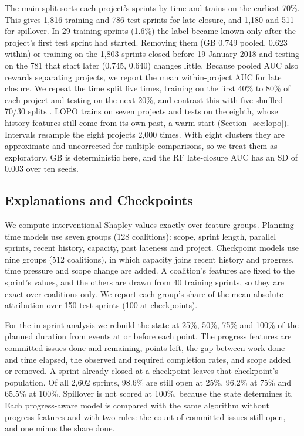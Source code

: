 \documentclass[conference]{IEEEtran}
\begin{document}
The main split sorts each project's sprints by time and trains on the earliest 70\%. This gives 1,816 training and 786 test sprints for late closure, and 1,180 and 511 for spillover. In 29 training sprints (1.6\%) the label became known only after the project's first test sprint had started. Removing them (GB 0.749 pooled, 0.623 within) or training on the 1,803 sprints closed before 19 January 2018 and testing on the 781 that start later (0.745, 0.640) changes little. Because pooled AUC also rewards separating projects, we report the mean within-project AUC for late closure. We repeat the time split five times, training on the first 40\% to 80\% of each project and testing on the next 20\%, and contrast this with five shuffled 70/30 splits \cite{r22, r24}. LOPO trains on seven projects and tests on the eighth, whose history features still come from its own past, a warm start (Section~\ref{sec:lopo}). Intervals resample the eight projects 2,000 times. With eight clusters they are approximate and uncorrected for multiple comparisons, so we treat them as exploratory. GB is deterministic here, and the RF late-closure AUC has an SD of 0.003 over ten seeds.

\subsection{Explanations and Checkpoints}

We compute interventional Shapley values exactly over feature groups. Planning-time models use seven groups (128 coalitions): scope, sprint length, parallel sprints, recent history, capacity, past lateness and project. Checkpoint models use nine groups (512 coalitions), in which capacity joins recent history and progress, time pressure and scope change are added. A coalition's features are fixed to the sprint's values, and the others are drawn from 40 training sprints, so they are exact over coalitions only. We report each group's share of the mean absolute attribution over 150 test sprints (100 at checkpoints).

For the in-sprint analysis we rebuild the state at 25\%, 50\%, 75\% and 100\% of the planned duration from events at or before each point. The progress features are committed issues done and remaining, points left, the gap between work done and time elapsed, the observed and required completion rates, and scope added or removed. A sprint already closed at a checkpoint leaves that checkpoint's population. Of all 2,602 sprints, 98.6\% are still open at 25\%, 96.2\% at 75\% and 65.5\% at 100\%. Spillover is not scored at 100\%, because the state determines it. Each progress-aware model is compared with the same algorithm without progress features and with two rules: the count of committed issues still open, and one minus the share done.
\end{document}
